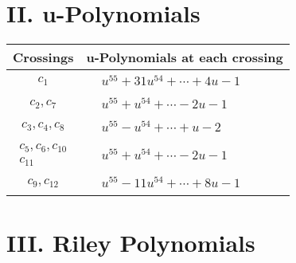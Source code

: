 \documentclass[1p]{elsarticle_modified}
\theoremstyle{definition}
\begin{document}
\newpage\renewcommand{\arraystretch}{1}
\centering \section*{ II. u-Polynomials}
\begin{tabular}{m{50pt}|m{274pt}}
Crossings & \hspace{64pt}u-Polynomials at each crossing \\
\hline $$\begin{aligned}c_{1}\end{aligned}$$&$\begin{aligned}
&u^{55}+31 u^{54}+\cdots+4 u-1
\end{aligned}$\\
\hline $$\begin{aligned}c_{2},c_{7}\end{aligned}$$&$\begin{aligned}
&u^{55}+u^{54}+\cdots-2 u-1
\end{aligned}$\\
\hline $$\begin{aligned}c_{3},c_{4},c_{8}\end{aligned}$$&$\begin{aligned}
&u^{55}- u^{54}+\cdots+u-2
\end{aligned}$\\
\hline $$\begin{aligned}c_{5},c_{6},c_{10}\\c_{11}\end{aligned}$$&$\begin{aligned}
&u^{55}+u^{54}+\cdots-2 u-1
\end{aligned}$\\
\hline $$\begin{aligned}c_{9},c_{12}\end{aligned}$$&$\begin{aligned}
&u^{55}-11 u^{54}+\cdots+8 u-1
\end{aligned}$\\
\hline
\end{tabular}\newpage\renewcommand{\arraystretch}{1}
\centering \section*{ III. Riley Polynomials}
\end{document}
